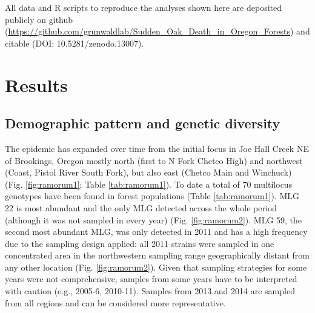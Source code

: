 \documentclass[double,12pt]{beavtex}
\begin{document}
  All data and R scripts to reproduce the analyses shown here are
  deposited publicly on github
  (\url{https://github.com/grunwaldlab/Sudden_Oak_Death_in_Oregon_Forests})
  and citable (DOI: 10.5281/zenodo.13007).
  
  \section{Results}\label{results}
  
  \subsection{Demographic pattern and genetic
  diversity}\label{demographic-pattern-and-genetic-diversity}
  
  The epidemic has expanded over time from the initial focus in Joe Hall
  Creek NE of Brookings, Oregon mostly north (first to N Fork Chetco High)
  and northwest (Coast, Pistol River South Fork), but also east (Chetco
  Main and Winchuck) (Fig. \ref{fig:ramorum1}; Table \ref{tab:ramorum1}).
  To date a total of 70 multilocus genotypes have been found in forest
  populations (Table \ref{tab:ramorum1}). MLG 22 is most abundant and the
  only MLG detected across the whole period (although it was not sampled
  in every year) (Fig. \ref{fig:ramorum2}). MLG 59, the second most
  abundant MLG, was only detected in 2011 and has a high frequency due to
  the sampling design applied: all 2011 strains were sampled in one
  concentrated area in the northwestern sampling range geographically
  distant from any other location (Fig. \ref{fig:ramorum2}). Given that
  sampling strategies for some years were not comprehensive, samples from
  some years have to be interpreted with caution (e.g., 2005-6, 2010-11).
  Samples from 2013 and 2014 are sampled from all regions and can be
  considered more representative.
  
\end{document}
